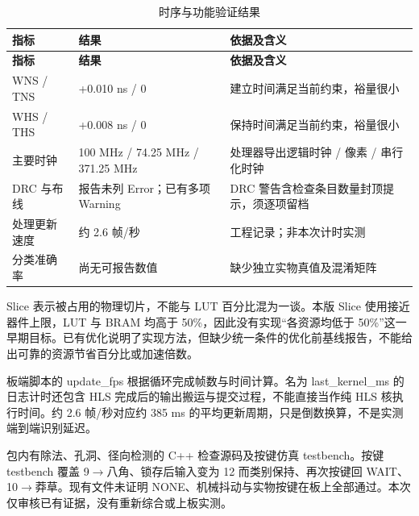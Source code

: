 \documentclass[UTF8,fontset=windows,a4paper,11pt]{ctexart}
\begin{document}
\begin{center}
\begingroup
\fontsize{8.5}{11}\selectfont
\setlength{\tabcolsep}{3pt}
\renewcommand{\arraystretch}{1.22}
\begin{longtable}{@{}p{3.024cm}p{4.065cm}p{6.711cm}@{}}
\caption{时序与功能验证结果}\\
\toprule
\textbf{指标} & \textbf{结果} & \textbf{依据及含义} \\
\midrule
\endfirsthead
\toprule
\textbf{指标} & \textbf{结果} & \textbf{依据及含义} \\
\midrule
\endhead
\bottomrule
\endfoot
WNS / TNS & +0.010 ns / 0 & 建立时间满足当前约束，裕量很小 \\
WHS / THS & +0.008 ns / 0 & 保持时间满足当前约束，裕量很小 \\
主要时钟 & 100 MHz / 74.25 MHz / 371.25 MHz & 处理器导出逻辑时钟 / 像素 / 串行化时钟 \\
DRC 与布线 & 报告未列 Error；已有多项 Warning & DRC 警告含检查条目数量封顶提示，须逐项留档 \\
处理更新速度 & 约 2.6 帧/秒 & 工程记录；非本次计时实测 \\
分类准确率 & 尚无可报告数值 & 缺少独立实物真值及混淆矩阵 \\
\end{longtable}
\endgroup
\end{center}

Slice 表示被占用的物理切片，不能与 LUT 百分比混为一谈。本版 Slice 使用接近器件上限，LUT 与 BRAM 均高于 50\%，因此没有实现“各资源均低于 50\%”这一早期目标。已有优化说明了实现方法，但缺少统一条件的优化前基线报告，不能给出可靠的资源节省百分比或加速倍数。\par

板端脚本的 update\_fps 根据循环完成帧数与时间计算。名为 last\_kernel\_ms 的日志计时还包含 HLS 完成后的输出搬运与提交过程，不能直接当作纯 HLS 核执行时间。约 2.6 帧/秒对应约 385 ms 的平均更新周期，只是倒数换算，不是实测端到端识别延迟。\par

包内有除法、孔洞、径向检测的 C++ 检查源码及按键仿真 testbench。按键 testbench 覆盖 9$\rightarrow$八角、锁存后输入变为 12 而类别保持、再次按键回 WAIT、10$\rightarrow$莽草。现有文件未证明 NONE、机械抖动与实物按键在板上全部通过。本次仅审核已有证据，没有重新综合或上板实测。\par
\end{document}
